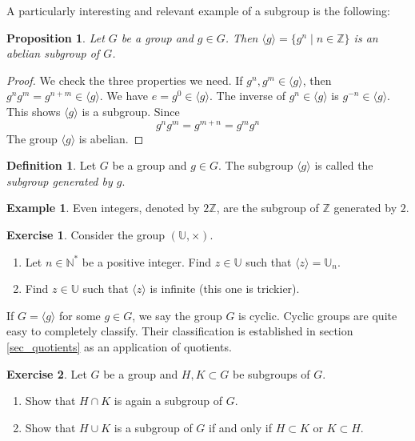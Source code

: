 \documentclass{book}
\newcommand{\N}{\mathbb{N}}
\newcommand{\Z}{\mathbb{Z}}
\newcommand{\U}{\mathbb{U}}
\theoremstyle{plain}
\newtheorem{proposition}[theorem]{Proposition}
\theoremstyle{definition}
\newtheorem{definition}[theorem]{Definition}
\newtheorem{example}[theorem]{Example}
\newtheorem{exercise}{Exercise}[section]
\theoremstyle{remark}
\begin{document}
A particularly interesting and relevant example of a subgroup is the following:

\begin{proposition}
    Let $G$ be a group and $g \in G$. Then $\langle g \rangle = \{g^n \mid n \in \Z\}$ is an abelian subgroup of $G$.
\end{proposition}

\begin{proof}
    We check the three properties we need. If $g^n,g^m \in \langle g \rangle$, then $g^n g^m = g^{n+m} \in \langle g \rangle$. We have $e = g^0 \in \langle g \rangle$. The inverse of $g^n \in \langle g \rangle$ is $g^{-n} \in \langle g \rangle$. This shows $\langle g \rangle$ is a subgroup. Since 
    \[g^n g^m = g^{m+n} = g^m g^n\]
    The group $\langle g\rangle$ is abelian.
\end{proof}

\begin{definition}
    Let $G$ be a group and $g \in G$. The subgroup $\langle g \rangle$ is called the \emph{subgroup generated by $g$}.
\end{definition}

\begin{example}
    Even integers, denoted by $2\Z$, are the subgroup of $\Z$ generated by $2$.
\end{example}

\begin{exercise}
    Consider the group $(\U,\times)$.
    \begin{enumerate}
        \item Let $n \in \N^*$ be a positive integer. Find $z \in \U$ such that $\langle z \rangle = \U_n$.
        \item Find $z \in\U$ such that $\langle z \rangle$ is infinite (this one is trickier).
    \end{enumerate}
\end{exercise}

If $G = \langle g\rangle$ for some $g \in G$, we say the group $G$ is cyclic. Cyclic groups are quite easy to completely classify. Their classification is established in section \ref{sec_quotients} as an application of quotients.

\begin{exercise}
    Let $G$ be a group and $H,K \subset G$ be subgroups of $G$.
    \begin{enumerate}
        \item Show that $H \cap K$ is again a subgroup of $G$.
        \item Show that $H \cup K$ is a subgroup of $G$ if and only if $H \subset K$ or $K \subset H$.
    \end{enumerate}
\end{exercise}
\end{document}
